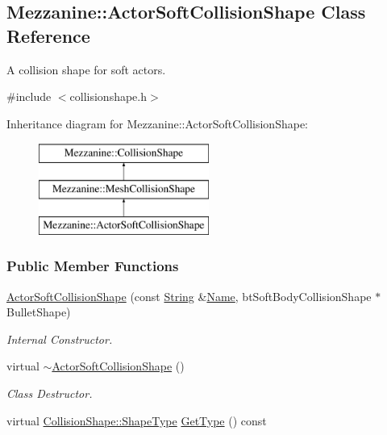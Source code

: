\hypertarget{classMezzanine_1_1ActorSoftCollisionShape}{
\subsection{Mezzanine::ActorSoftCollisionShape Class Reference}
\label{classMezzanine_1_1ActorSoftCollisionShape}
}


A collision shape for soft actors.  




{\ttfamily \#include $<$collisionshape.h$>$}

Inheritance diagram for Mezzanine::ActorSoftCollisionShape:\begin{figure}[H]
\begin{center}
\leavevmode
\includegraphics[height=3.000000cm]{classMezzanine_1_1ActorSoftCollisionShape}
\end{center}
\end{figure}
\subsubsection*{Public Member Functions}
\begin{DoxyCompactItemize}
\item 
\hyperlink{classMezzanine_1_1ActorSoftCollisionShape_abf4ea33ed056afcac18a41366fedccc1}{ActorSoftCollisionShape} (const \hyperlink{namespaceMezzanine_acf9fcc130e6ebf08e3d8491aebcf1c86}{String} \&\hyperlink{classMezzanine_1_1CollisionShape_aac524c5c56fa4d158bc071f8aecfbe79}{Name}, btSoftBodyCollisionShape $\ast$BulletShape)
\begin{DoxyCompactList}\small\item\em Internal Constructor. \item\end{DoxyCompactList}\item 
\hypertarget{classMezzanine_1_1ActorSoftCollisionShape_aba997fd9f65ace81db3779a952eba27e}{
virtual \hyperlink{classMezzanine_1_1ActorSoftCollisionShape_aba997fd9f65ace81db3779a952eba27e}{$\sim$ActorSoftCollisionShape} ()}
\label{classMezzanine_1_1ActorSoftCollisionShape_aba997fd9f65ace81db3779a952eba27e}

\begin{DoxyCompactList}\small\item\em Class Destructor. \item\end{DoxyCompactList}\item 
virtual \hyperlink{classMezzanine_1_1CollisionShape_ad04186055565998879b64176d6dd100d}{CollisionShape::ShapeType} \hyperlink{classMezzanine_1_1ActorSoftCollisionShape_ae9ac8413434ff0de10376deb64ab49d0}{GetType} () const 
\end{DoxyCompactItemize}
